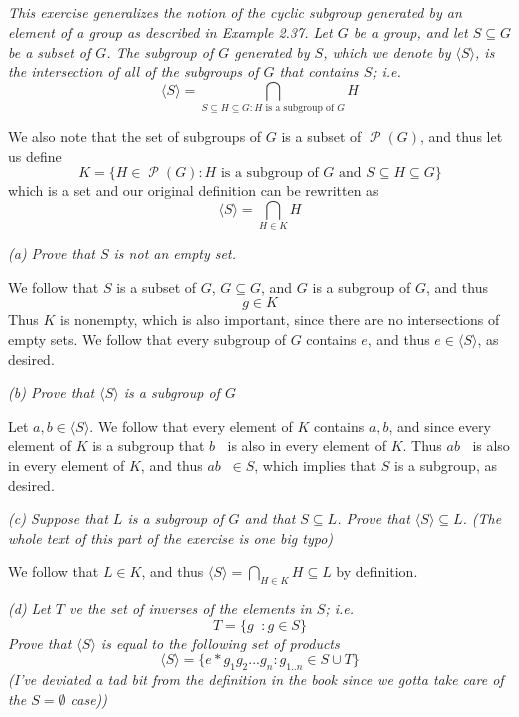 \documentclass[11pt,oneside,titlepage]{book}
\DeclareMathOperator \pow {\mathcal {P}}
\DeclareMathOperator \inv {^{-1}}
\newcommand{\eangle}[1]{\langle #1 \rangle}
\newcommand{\set}[1]{\{ #1 \}}
\begin{document}
\subsection{}

\textit{This exercise generalizes the notion of the cyclic subgroup
  generated by an element of a group as described in Example 2.37.
  Let $G$ be a group, and let $S \subseteq G$ be a subset of $G$. The
  subgroup of $G$ generated by $S$, which we denote by $\eangle{S}$,
  is the intersection of all of the subgroups of $G$ that contains $S$;
  i.e.
  $$\eangle{S} = \bigcap_{S \subseteq H \subseteq G: H\text{ is a subgroup of }G} H$$
}

We also note that the set of subgroups of $G$ is a subset of $\pow(G)$,
and thus let us define
$$K = \set{H \in \pow(G): H\text{ is a subgroup of }G \text{ and }S \subseteq H \subseteq G}$$
which is a set and our original definition can be rewritten as
$$\eangle{S} = \bigcap_{H \in K}{H}$$

\textit{(a) Prove that $S$ is not an empty set.}

We follow that $S$ is a subset of $G$, $G \subseteq G$, and $G$ is a
subgroup of $G$, and thus
$$g \in K$$
Thus $K$ is nonempty, which is also important, since there are no
intersections of empty sets.  We follow that every subgroup of $G$
contains $e$, and thus $e \in \eangle{S}$, as desired.

\textit{(b) Prove that $\eangle{S}$ is a subgroup of $G$}

Let $a, b \in \eangle{S}$. We follow that every element of $K$ contains $a, b$, and
since every element of $K$ is a subgroup that $b\inv$ is also in every element of $K$.
Thus $a b\inv$ is also in every element of $K$, and thus $a b\inv \in S$, which implies that
$S$ is a subgroup, as desired.

\textit{(c) Suppose that $L$ is a subgroup of $G$ and that $S \subseteq L$. Prove that
  $\eangle{S} \subseteq L$. (The whole text of this part of the
  exercise is one big typo)
}

We follow that $L \in K$, and thus $\eangle{S} = \bigcap_{H \in K}{H}
\subseteq L$ by definition.

\textit{(d) Let $T$ ve the set of inverses of the elements in $S$; i.e.
  $$T = \set{g\inv: g \in S}$$
  Prove that $\eangle{S}$ is equal to the following set of products
  $$\eangle{S} = \set{e * g_1 g_2 ... g_n: g_{1..n} \in S \cup T}$$
  (I've deviated a tad bit from the definition in the book since we gotta
  take care of the $S = \emptyset$ case))
}
\end{document}
